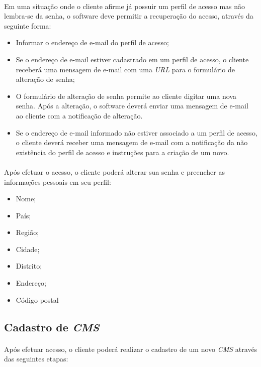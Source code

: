 \documentclass[a4paper,12pt]{article}
\def\cms{\emph{CMS}}
\begin{document}
\paragraph{}
Em uma situação onde o cliente afirme já possuir um perfil de acesso mas não lembra-se da senha, o software deve permitir a recuperação do acesso, através da seguinte forma:
\begin{itemize}
\item Informar o endereço de e-mail do perfil de acesso;
\item Se o endereço de e-mail estiver cadastrado em um perfil de acesso, o cliente receberá uma mensagem de e-mail com uma \emph{URL} para o formulário de alteração de senha;
\item O formulário de alteração de senha permite ao cliente digitar uma nova senha. Após a alteração, o software deverá enviar uma mensagem de e-mail ao cliente com a notificação de alteração.
\item Se o endereço de e-mail informado não estiver associado a um perfil de acesso, o cliente deverá receber uma mensagem de e-mail com a notificação da não existência do perfil de acesso e instruções para a criação de um novo.
\end{itemize}
\paragraph{}
Após efetuar o acesso, o cliente poderá alterar sua senha e preencher as informações pessoais em seu perfil:

\begin{itemize}
\item Nome;
\item País;
\item Região;
\item Cidade;
\item Distrito;
\item Endereço;
\item Código postal
\end{itemize}

\subsection{Cadastro de \cms{}}

\paragraph{}
Após efetuar acesso, o cliente poderá realizar o cadastro de um novo \cms{} através das seguintes etapas:
\end{document}
